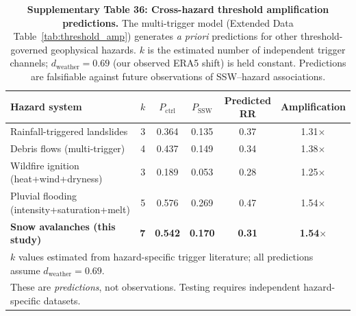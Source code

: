 \begin{table}[h!]
\centering
\caption{\textbf{Supplementary Table 36: Cross-hazard threshold amplification predictions.} The multi-trigger model (Extended Data Table~\ref{tab:threshold_amp}) generates \emph{a priori} predictions for other threshold-governed geophysical hazards. $k$ is the estimated number of independent trigger channels; $d_{\mathrm{weather}} = 0.69$ (our observed ERA5 shift) is held constant. Predictions are falsifiable against future observations of SSW--hazard associations.}
\label{tab:cross_hazard}
\begin{tabular}{lrcccc}
\toprule
Hazard system & $k$ & $P_{\mathrm{ctrl}}$ & $P_{\mathrm{SSW}}$ & Predicted RR & Amplification \\
\midrule
Rainfall-triggered landslides & 3 & 0.364 & 0.135 & 0.37 & 1.31$\times$ \\
Debris flows (multi-trigger) & 4 & 0.437 & 0.149 & 0.34 & 1.38$\times$ \\
Wildfire ignition (heat+wind+dryness) & 3 & 0.189 & 0.053 & 0.28 & 1.25$\times$ \\
Pluvial flooding (intensity+saturation+melt) & 5 & 0.576 & 0.269 & 0.47 & 1.54$\times$ \\
\textbf{Snow avalanches (this study)} & \textbf{7} & \textbf{0.542} & \textbf{0.170} & \textbf{0.31} & \textbf{1.54$\times$} \\
\bottomrule
\multicolumn{6}{l}{\footnotesize $k$ values estimated from hazard-specific trigger literature; all predictions assume $d_{\mathrm{weather}} = 0.69$.} \\
\multicolumn{6}{l}{\footnotesize These are \emph{predictions}, not observations. Testing requires independent hazard-specific datasets.} \\
\end{tabular}
\end{table}

